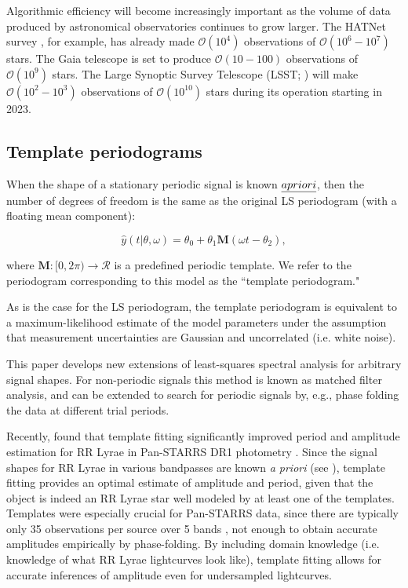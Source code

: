 \documentclass{aastex62}
\newcommand{\bigO}{\mathcal{O}}
\begin{document}
Algorithmic efficiency will become increasingly important as the volume
of data produced by astronomical observatories continues to grow larger. The HATNet survey
\citep{HATNet}, for example, has already made $\bigO(10^4)$ observations of
$\bigO(10^6-10^7)$ stars. The Gaia telescope \citep{GAIA} is set to produce $\bigO(10-100)$
observations of $\bigO(10^9)$ stars. The Large Synoptic Survey Telescope (LSST; \cite{LSST})
will make $\bigO(10^2-10^3)$ observations of $\bigO(10^{10})$ stars during its operation starting in 2023.


\subsection{Template periodograms}

When the shape of a stationary periodic signal is known $\emph{a priori}$, then the number of degrees of freedom is the same as the original LS periodogram (with a floating mean component):

\begin{equation}
    \hat{y}(t|\theta, \omega) = \theta_0 + \theta_1 \mathbf{M}(\omega t - \theta_2),
\end{equation}

where $\mathbf{M}:[0, 2\pi)\rightarrow \mathcal{R}$ is a predefined periodic template.
We refer to the periodogram corresponding to this model as the ``template periodogram."

As is the case for the LS periodogram, the template periodogram
is equivalent to a maximum-likelihood estimate of the model parameters under the assumption that
measurement uncertainties are Gaussian and uncorrelated (i.e. white noise).

This paper develops new extensions of least-squares spectral analysis for arbitrary
signal shapes. For non-periodic signals this method is known as matched filter analysis,
and can be extended to search for periodic signals by, e.g., phase folding the data
at different trial periods.

Recently, \cite{Sesar_etal_2016} found that template fitting significantly improved
period and amplitude estimation for RR Lyrae in Pan-STARRS DR1 photometry \citep{PanSTARRS}. Since the signal
shapes for RR Lyrae in various bandpasses are known \emph{a priori} (see \cite{Sesar_etal_2010}),
template fitting provides an optimal estimate of amplitude and period,
given that the object is indeed an RR Lyrae star well modeled by at least one of the templates.
Templates were especially crucial for Pan-STARRS data, since there are typically only
35 observations per source over 5 bands \citep{Hernitschek_etal_2016}, not enough to obtain
accurate amplitudes empirically by phase-folding. By including domain knowledge (i.e. knowledge of what RR Lyrae
lightcurves look like), template fitting allows for accurate inferences of amplitude even
for undersampled lightcurves.
\end{document}
